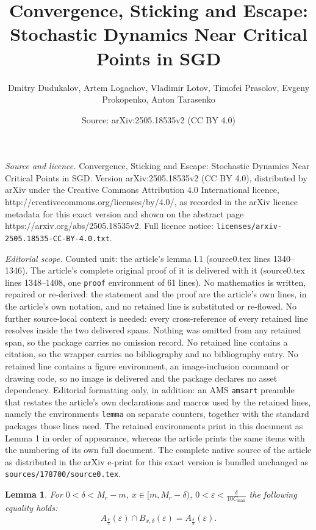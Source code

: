\documentclass[10pt,a4paper]{amsart}
\title{Convergence, Sticking and Escape: Stochastic Dynamics Near Critical Points in SGD}
\author{Dmitry Dudukalov, Artem Logachov, Vladimir Lotov, Timofei Prasolov, Evgeny Prokopenko, Anton Tarasenko}
\date{Source: arXiv:2505.18535v2 (CC BY 4.0)}
\newtheorem{lemma}{Lemma}
\newcommand{\beq}{\begin{equation}}
\newcommand{\eeq}{\end{equation}}
\begin{document}
\maketitle

\noindent\emph{Source and licence.} Convergence, Sticking and Escape: Stochastic Dynamics Near Critical Points in SGD. Version arXiv:2505.18535v2 (CC BY 4.0), distributed by arXiv under the Creative Commons Attribution 4.0 International licence, http://creativecommons.org/licenses/by/4.0/, as recorded in the arXiv licence metadata for this exact version and shown on the abstract page https://arxiv.org/abs/2505.18535v2. Full licence notice: \texttt{licenses/arxiv-2505.18535-CC-BY-4.0.txt}.\par\smallskip

\noindent\textit{Editorial scope.} Counted unit: the article's lemma l.1 (source0.tex lines 1340--1346). The article's complete original proof of it is delivered with it (source0.tex lines 1348--1408, one \texttt{proof} environment of 61 lines). No mathematics is written, repaired or re-derived: the statement and the proof are the article's own lines, in the article's own notation, and no retained line is substituted or re-flowed.  No further source-local context is needed: every cross-reference of every retained line resolves inside the two delivered spans.  Nothing was omitted from any retained span, so the package carries no omission record.  No retained line contains a citation, so the wrapper carries no bibliography and no bibliography entry.  No retained line contains a figure environment, an image-inclusion command or drawing code, so no image is delivered and the package declares no asset dependency.  Editorial formatting only, in addition: an AMS \texttt{amsart} preamble that restates the article's own declarations and macros used by the retained lines, namely the environments \texttt{lemma} on separate counters, together with the standard packages those lines need.  The retained environments print in this document as Lemma 1 in order of appearance, whereas the article prints the same items with the numbering of its own full document.  The complete native source of the article as distributed in the arXiv e-print for this exact version is bundled unchanged as \texttt{sources/178700/source0.tex}.
\begin{lemma} \label{l.1}
For $0<\delta<M_r-m$, $x\in[m,M_r-\delta)$,
$0<\varepsilon<\frac{\delta}{10 C_{\max}}$ the following equality holds:
\beq\label{20.11.5}
A_{\frac{\delta}{5}}\left(\varepsilon\right)\cap B_{x,\delta}\left(\varepsilon\right)=A_{\frac{\delta}{5}}\left(\varepsilon\right).
\eeq
\end{lemma}
\end{document}
